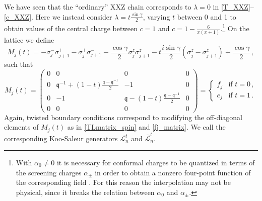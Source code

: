 \documentclass[a4paper,10pt]{article}
\newcommand{\q}{\mathfrak{q}}
\newcommand{\linnea}[1]{$\framebox{\tiny L}$\ \textbf{\texttt{{\color{red}\footnotesize#1}}}}
\newcommand{\KSgen}{\mathcal{L}}
\begin{document}
We have seen that the ``ordinary'' XXZ chain corresponds to $\lambda=0$ in \eqref{T_XXZ}--\eqref{c_XXZ}. Here we instead consider $\lambda= t \frac{\sin\gamma}{2}$, varying $t$ between 0 and 1 to obtain values of the central charge between $c=1$ and $c=1-\frac{6}{x(x+1)}$.\footnote{
With $\alpha_0 \neq 0$ it is necessary for conformal charges to be quantized in terms of the screening charges $\alpha_\pm$ in order to obtain a nonzero four-point function of the corresponding field \cite{DotsenkoFateev}. For this reason the interpolation may not be physical, since it breaks the relation between $\alpha_0$ and $\alpha_\pm$.
} On the lattice we define
\begin{equation}\label{interpolated}
M_j(t) = -\sigma_j^{-}\sigma_{j+1}^{+}-\sigma_j^{+}\sigma_{j+1}^{-}
-\frac{\cos\gamma}{2}\sigma_j^{z}\sigma_{j+1}^{z} -t\frac{i\sin\gamma}{2}(\sigma_j^{z}-\sigma_{j+1}^{z})+\frac{\cos\gamma}{2} \,,
\end{equation}
such that 
\begin{equation}\label{Ln_interpolating}
M_j(t) = 
\begin{pmatrix}
0 & 0 & 0 & 0 \\
0 & \q^{-1} + (1-t)\frac{\q-\q^{-1}}{2}  & -1 & 0\\
0 & -1 & \q- (1-t)\frac{\q-\q^{-1}}{2} & 0\\
0 & 0 & 0 & 0 
\end{pmatrix} 
=
\begin{cases}
f_j &\text{if } t=0 \,, \\
e_j &\text{if } t=1 \,.
\end{cases}
\end{equation}
Again, twisted boundary conditions correspond to modifying the off-diagonal elements of $M_j(t)$ as in \eqref{TLmatrix_spin} and \eqref{fj_matrix}. 
We call the corresponding Koo-Saleur generators $\KSgen^t_n$ and $\bar{\KSgen}^t_n$.
\end{document}
